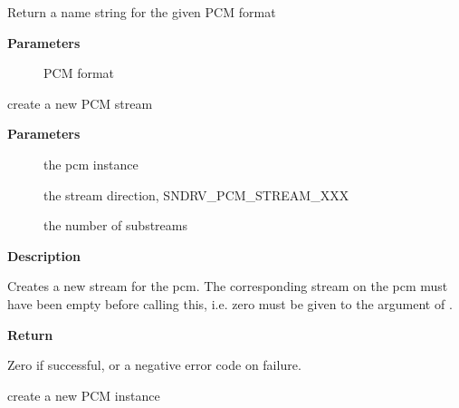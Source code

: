 \documentclass[a4paper,8pt,english]{sphinxmanual}
\begin{document}
\begin{fulllineitems}
\label{sound/kernel-api/alsa-driver-api:c.snd_pcm_format_name}
Return a name string for the given PCM format

\end{fulllineitems}


\textbf{Parameters}
\begin{description}
\item[{}] \leavevmode
PCM format

\end{description}

\begin{fulllineitems}
\label{sound/kernel-api/alsa-driver-api:c.snd_pcm_new_stream}
create a new PCM stream

\end{fulllineitems}


\textbf{Parameters}
\begin{description}
\item[{}] \leavevmode
the pcm instance

\item[{}] \leavevmode
the stream direction, SNDRV\_PCM\_STREAM\_XXX

\item[{}] \leavevmode
the number of substreams

\end{description}

\textbf{Description}

Creates a new stream for the pcm.
The corresponding stream on the pcm must have been empty before
calling this, i.e. zero must be given to the argument of
.

\textbf{Return}

Zero if successful, or a negative error code on failure.

\begin{fulllineitems}
\label{sound/kernel-api/alsa-driver-api:c.snd_pcm_new}
create a new PCM instance

\end{fulllineitems}
\end{document}
